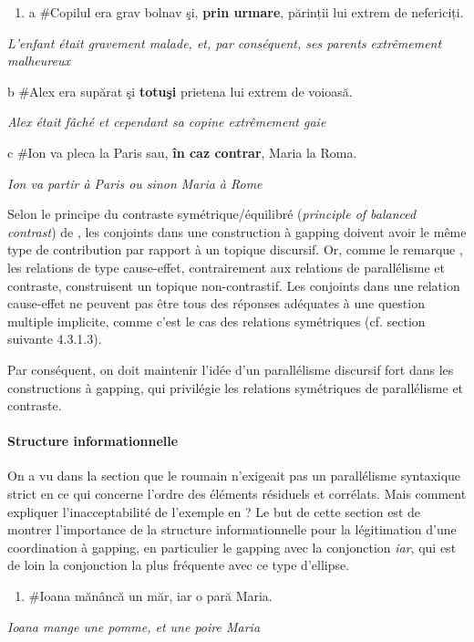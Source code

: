 \begin{enumerate}
\item \label{bkm:Ref289623742}a  \#Copilul era grav bolnav şi, \textbf{prin urmare}, părinții lui extrem de nefericiți.


\end{enumerate}
{\itshape
L'enfant était gravement malade, et, par conséquent, ses parents extrêmement malheureux } 

  b  \#Alex era supărat şi \textbf{totuşi} prietena lui extrem de voioasă. 

    \textit{Alex était fâché et cependant sa copine extrêmement gaie}

  c  \#Ion va pleca la Paris sau, \textbf{în caz contrar}, Maria la Roma. 

    \textit{Ion va partir à Paris ou sinon Maria à Rome } 

Selon le principe du contraste symétrique/équilibré (\textit{principle of balanced contrast}) de \citet{Repp2009}, les conjoints dans une construction à gapping doivent avoir le même type de contribution par rapport à un topique discursif. Or, comme le remarque \citet{Hendriks2004}, les relations de type cause-effet, contrairement aux relations de parallélisme et contraste, construisent un topique non-contrastif. Les conjoints dans une relation cause-effet ne peuvent pas être tous des réponses adéquates à une question multiple implicite, comme c'est le cas des relations symétriques (cf. section suivante 4.3.1.3). 

Par conséquent, on doit maintenir l'idée d'un parallélisme discursif fort dans les constructions à gapping, qui privilégie les relations symétriques de parallélisme et contraste. 

\paragraph[Structure informationnelle]{Structure informationnelle}
\label{bkm:Ref289439451}On a vu dans la section  que le roumain n'exigeait pas un parallélisme syntaxique strict en ce qui concerne l'ordre des éléments résiduels et corrélats. Mais comment expliquer l'inacceptabilité de l'exemple en  ? Le but de cette section est de montrer l'importance de la structure informationnelle pour la légitimation d'une coordination à gapping, en particulier le gapping avec la conjonction \textit{iar}, qui est de loin la conjonction la plus fréquente avec ce type d'ellipse. 


\begin{enumerate}
\item \label{bkm:Ref289631912}\#Ioana mănâncă un măr, iar o pară Maria.


\end{enumerate}
{\itshape
Ioana mange une pomme, et une poire Maria } 

